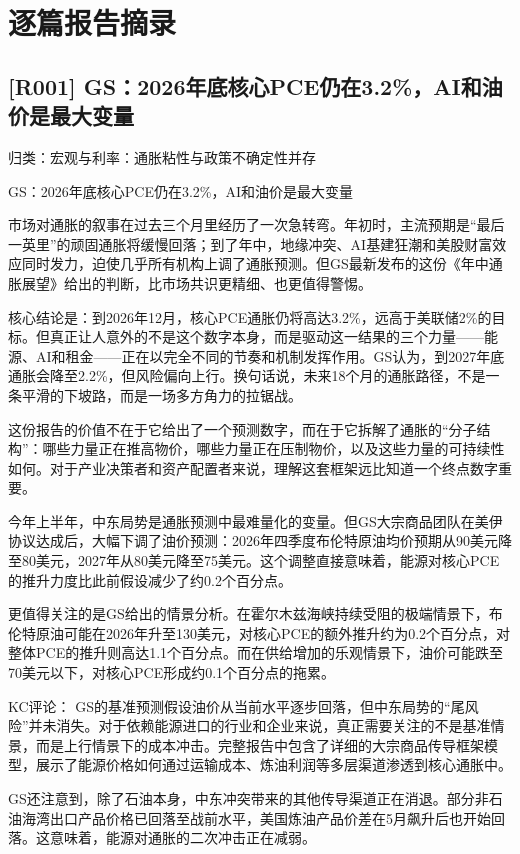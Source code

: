 \documentclass[11pt]{ctexart}
\begin{document}
\section{逐篇报告摘录}
\subsection{[R001] GS：2026年底核心PCE仍在3.2\%，AI和油价是最大变量}
{\small\color{refgray}归类：宏观与利率：通胀粘性与政策不确定性并存}

GS：2026年底核心PCE仍在3.2\%，AI和油价是最大变量

市场对通胀的叙事在过去三个月里经历了一次急转弯。年初时，主流预期是“最后一英里”的顽固通胀将缓慢回落；到了年中，地缘冲突、AI基建狂潮和美股财富效应同时发力，迫使几乎所有机构上调了通胀预测。但GS最新发布的这份《年中通胀展望》给出的判断，比市场共识更精细、也更值得警惕。

核心结论是：到2026年12月，核心PCE通胀仍将高达3.2\%，远高于美联储2\%的目标。但真正让人意外的不是这个数字本身，而是驱动这一结果的三个力量——能源、AI和租金——正在以完全不同的节奏和机制发挥作用。GS认为，到2027年底通胀会降至2.2\%，但风险偏向上行。换句话说，未来18个月的通胀路径，不是一条平滑的下坡路，而是一场多方角力的拉锯战。

这份报告的价值不在于它给出了一个预测数字，而在于它拆解了通胀的“分子结构”：哪些力量正在推高物价，哪些力量正在压制物价，以及这些力量的可持续性如何。对于产业决策者和资产配置者来说，理解这套框架远比知道一个终点数字重要。

今年上半年，中东局势是通胀预测中最难量化的变量。但GS大宗商品团队在美伊协议达成后，大幅下调了油价预测：2026年四季度布伦特原油均价预期从90美元降至80美元，2027年从80美元降至75美元。这个调整直接意味着，能源对核心PCE的推升力度比此前假设减少了约0.2个百分点。

更值得关注的是GS给出的情景分析。在霍尔木兹海峡持续受阻的极端情景下，布伦特原油可能在2026年升至130美元，对核心PCE的额外推升约为0.2个百分点，对整体PCE的推升则高达1.1个百分点。而在供给增加的乐观情景下，油价可能跌至70美元以下，对核心PCE形成约0.1个百分点的拖累。

KC评论： GS的基准预测假设油价从当前水平逐步回落，但中东局势的“尾风险”并未消失。对于依赖能源进口的行业和企业来说，真正需要关注的不是基准情景，而是上行情景下的成本冲击。完整报告中包含了详细的大宗商品传导框架模型，展示了能源价格如何通过运输成本、炼油利润等多层渠道渗透到核心通胀中。

GS还注意到，除了石油本身，中东冲突带来的其他传导渠道正在消退。部分非石油海湾出口产品价格已回落至战前水平，美国炼油产品价差在5月飙升后也开始回落。这意味着，能源对通胀的二次冲击正在减弱。
\end{document}
